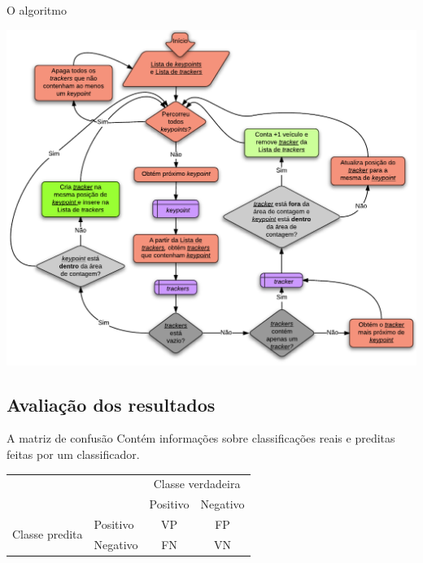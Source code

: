 \begin{frame}{O algoritmo}
  \begin{center}
    \includegraphics[scale=0.417]{imgs/fluxograma_contagem.pdf}
  \end{center}
\end{frame}


\subsection{Avaliação dos resultados} %
\label{sub:avalia_o_dos_resultados}

\begin{frame}{A matriz de confusão}
  Contém informações sobre classificações reais e preditas feitas por um classificador.

  \begin{center}
    \begin{tabular}{l|l|c|c|}

    \multicolumn{2}{c}{} & \multicolumn{2}{c}{Classe verdadeira} \\
    \cline{3-4}
    \multicolumn{2}{c|}{} & Positivo & Negativo \\
    \cline{2-4}
    \multirow{2}{*}{Classe predita} & Positivo & VP & FP \\
    \cline{2-4}
    & Negativo & FN & VN \\
    \cline{2-4}
    
    \end{tabular}
  \end{center}
\end{frame}

